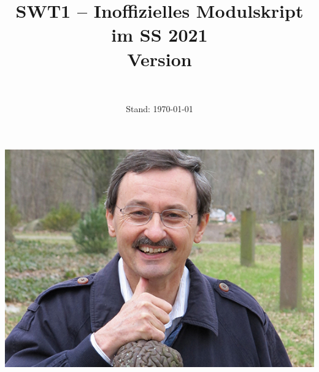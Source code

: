 \documentclass{article}
\title{SWT1 – Inoffizielles Modulskript im SS 2021\\[\subtitlelinesep]%
    \smaller[\subtitlerelsize]{}Version \version}
\author{\ushort\\\myName}
\date{Stand: \today}
\begin{document}
\maketitle
\includegraphics[width=\textwidth]{./data/tichy}
\newpage

\tableofcontents
\newpage

% 

\newpage


\newpage


\newpage


\newpage


\newpage



\newpage


\newpage


\newpage


\newpage


\newpage


\newpage


\newpage


\newpage


\newpage

\printindex
\newpage
\listoffigures
\end{document}
